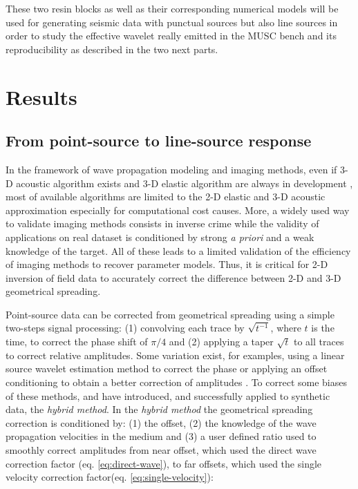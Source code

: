 \documentclass[manuscript,revised]{geophysics}
\newcommand{\twod}{2-D }
\newcommand{\thrd}{3-D }
\begin{document}
\noindent These two resin blocks as well as their corresponding numerical models will be used for generating seismic data with punctual sources but also line sources in order to study the effective wavelet really emitted in the MUSC bench and its reproducibility as described in the two next parts.

\section{Results}

\subsection{From point-source to line-source response}

\noindent In the framework of wave propagation modeling and imaging methods, even if \thrd acoustic algorithm exists \citep{benhadjali_FWI_2008,plessix_FWI_2010} and \thrd elastic algorithm are always in development \citep{castellanos_AMD_2011,Borisov_FWI_2015}, most of available algorithms are limited to the \twod elastic and \thrd acoustic approximation especially for computational cost causes. More, a widely used way to validate imaging methods consists in inverse crime while the validity of applications on real dataset is conditioned by strong \textit{a priori} and a weak knowledge of the target. All of these leads to a limited validation of the efficiency of imaging methods to recover parameter models. Thus, it is critical for \twod inversion of field data to accurately correct the difference between \twod and \thrd geometrical spreading.

\noindent Point-source data can be corrected from geometrical spreading using a simple two-steps signal processing: (1) convolving each trace by $\sqrt{t^{-1}}$, where $t$ is the time, to correct the phase shift of $\pi/4$ and (2) applying a taper $\sqrt{t}$ to all traces to correct relative amplitudes. Some variation exist, for examples, using a linear source wavelet estimation method to correct the phase \citep{Bretaudeau_FWI_2013} or applying an offset conditioning to obtain a better correction of amplitudes \citep{Tran_SWT_2013}. To correct some biases of these methods, \citet{Forbriger_LSS_2014} and \citet{Schafer_LSS_2014} have introduced, and successfully applied to synthetic data, the \textit{hybrid method}. In the \textit{hybrid method} the geometrical spreading correction is conditioned by: (1) the offset, (2) the knowledge of the wave propagation velocities in the medium and (3) a user defined ratio used to smoothly correct amplitudes from near offset, which used the direct wave correction factor (eq. \ref{eq:direct-wave}), to far offsets, which used the single velocity correction factor(eq. \ref{eq:single-velocity}): 
\end{document}
